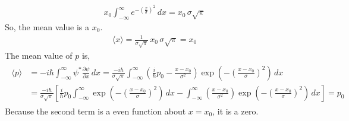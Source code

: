 \documentclass[floatfix,nofootinbib,superscriptaddress,fleqn]{revtex4-2}
\begin{document}
\begin{itemize}
\begin{align*}
    x_0\int_{-\infty}^{\infty} e^{-{\left(\frac{x}{\sigma}\right)}^2}\,dx 
    = x_0\,\sigma\sqrt{\pi}
  \end{align*}
So, the mean value is a $x_0$.
  \begin{align}
    \langle x \rangle=\frac{1}{\sigma\sqrt{\pi}}\,x_0\,\sigma\sqrt{\pi} = x_0
  \end{align}
The mean value of $p$ is,
  \begin{align}
    \begin{split}
      \langle p \rangle &= -i\hbar \int_{-\infty}^{\infty} 
      \psi^*\frac{\partial \psi}{\partial x}\,dx 
      =\frac{-i\hbar}{\sigma\sqrt{\pi}}
      \int_{-\infty}^{\infty}
      \left(\frac{i}{\hbar}p_0
      -\frac{x-x_0}{\sigma^2}\right)
      \exp\left(-{\left(\frac{x-x_0}{\sigma}\right)}^2 \right)\,dx \\
      &=\frac{-i\hbar}{\sigma\sqrt{\pi}}\left[\frac{i}{\hbar}p_0
      \int_{-\infty}^{\infty}
      \exp\left(-{\left(\frac{x-x_0}{\sigma}\right)}^2 \right)\,dx 
      -\int_{-\infty}^{\infty}
      \left(\frac{x-x_0}{\sigma^2}\right)
      \exp\left(-{\left(\frac{x-x_0}{\sigma}\right)}^2\right)\,dx\right] 
      = p_0    
    \end{split}
  \end{align}
Because the second term is a even function about $x=x_0$, it is a zero.


\end{itemize}
\end{document}
